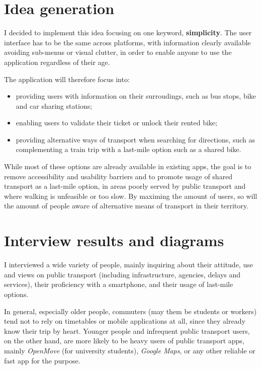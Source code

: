 \documentclass[11pt]{article}
\begin{document}
\section{Idea generation}

I decided to implement this idea focusing on one keyword, \textbf{simplicity}. The user interface has to be the same across platforms, with information clearly available avoiding sub-menus or visual clutter, in order to enable anyone to use the application regardless of their age.

The application will therefore focus into:
\begin{itemize}
    \item providing users with information on their surroudings, such as bus stops, bike and car sharing stations;
    \item enabling users to validate their ticket or unlock their rented bike;
    \item providing alternative ways of transport when searching for directions, such as complementing a train trip with a last-mile option such as a shared bike.
\end{itemize}

While most of these options are already available in existing apps, the goal is to remove accessibility and usability barriers and to promote usage of shared transport as a last-mile option, in areas poorly served by public transport and where walking is unfeasible or too slow. By maximing the amount of users, so will the amount of people aware of alternative means of transport in their territory.

\section{Interview results and diagrams}

I interviewed a wide variety of people, mainly inquiring about their attitude, use and views on public transport (including infrastructure, agencies, delays and services), their proficiency with a smartphone, and their usage of last-mile options.

In general, especially older people, commuters (may them be students or workers) tend not to rely on timetables or mobile applications at all, since they already know their trip by heart. Younger people and infrequent public transport users, on the other hand, are more likely to be heavy users of public transport apps, mainly \textit{OpenMove} (for university students), \textit{Google Maps}, or any other reliable or fast app for the purpose.
\end{document}
